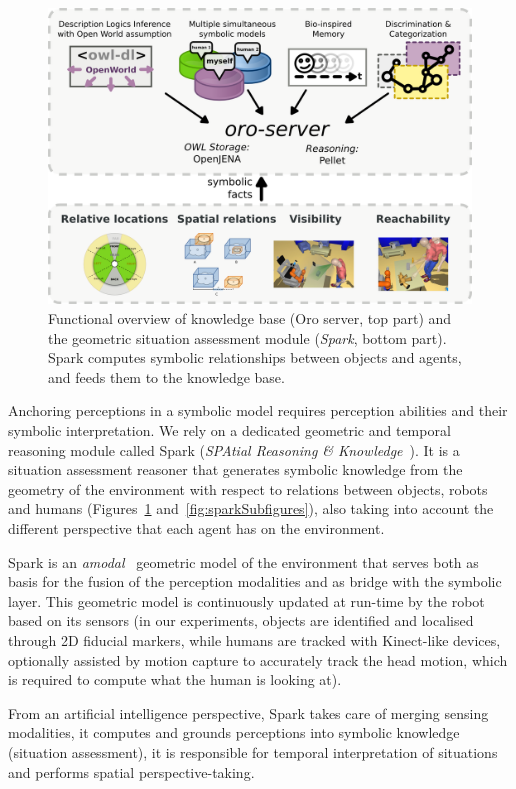 \documentclass[preprint,3p,times]{elsarticle}
\begin{document}
\begin{figure}
        \centering
        \includegraphics[width=0.8\columnwidth]{spark-oro.png}
    \caption{Functional overview of knowledge base ({\sc Oro} server, top part)
    and the geometric situation assessment module (\emph{{\sc Spark}}, bottom
    part). {\sc Spark} computes symbolic relationships between objects and
    agents, and feeds them to the knowledge base.}

        \label{fig|spark-oro}
\end{figure}

Anchoring perceptions in a symbolic model requires perception abilities and
their symbolic interpretation. We rely on a dedicated geometric and temporal
reasoning module called {\sc Spark} (\emph{SPAtial Reasoning \&
Knowledge}~\cite{Sisbot2011}). It is a situation assessment reasoner that
generates symbolic knowledge from the geometry of the environment with respect
to relations between objects, robots and humans (Figures~\ref{fig|spark-oro} and~\ref{fig:sparkSubfigures}),
also taking into account the different perspective that each agent has on the
environment.

{\sc Spark} is an \emph{amodal}~\cite{Mavridis2006} geometric model of the
environment that serves both as basis for the fusion of the perception
modalities and as bridge with the symbolic layer. This geometric model is
continuously updated at run-time by the robot based on its sensors (in our
experiments, objects are identified and localised through 2D fiducial markers, while
humans are tracked with Kinect-like devices, optionally assisted by motion
capture to accurately track the head motion, which is required to compute what
the human is looking at).

From an artificial intelligence perspective, {\sc Spark} takes care of merging
sensing modalities, it computes and grounds perceptions into symbolic
knowledge (situation assessment), it is responsible for temporal interpretation of
situations and performs spatial perspective-taking.
\end{document}
